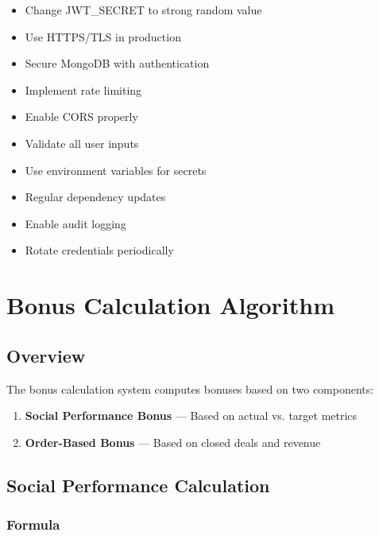 \documentclass[11pt,a4paper,oneside,openany]{book}
\begin{document}
\begin{tcolorbox}[colback=background,colframe=darkblue,title=Production Security Checklist]
\begin{itemize}
    \item[$\square$] Change JWT\_SECRET to strong random value
    \item[$\square$] Use HTTPS/TLS in production
    \item[$\square$] Secure MongoDB with authentication
    \item[$\square$] Implement rate limiting
    \item[$\square$] Enable CORS properly
    \item[$\square$] Validate all user inputs
    \item[$\square$] Use environment variables for secrets
    \item[$\square$] Regular dependency updates
    \item[$\square$] Enable audit logging
    \item[$\square$] Rotate credentials periodically
\end{itemize}
\end{tcolorbox}

\chapter{Bonus Calculation Algorithm}

\section{Overview}

The bonus calculation system computes bonuses based on two components:

\begin{enumerate}
    \item \textbf{Social Performance Bonus} --- Based on actual vs. target metrics
    \item \textbf{Order-Based Bonus} --- Based on closed deals and revenue
\end{enumerate}

\section{Social Performance Calculation}

\subsection{Formula}
\end{document}
